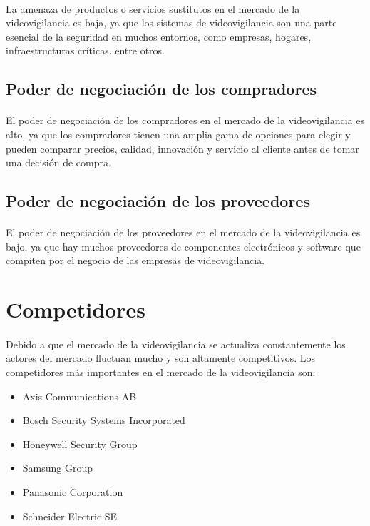 \documentclass{report}
\begin{document}
          \paragraph*{}{La amenaza de productos o servicios sustitutos en el mercado de la videovigilancia es baja, ya que los sistemas de videovigilancia son una parte esencial de la seguridad en muchos entornos, como empresas, hogares, infraestructuras críticas, entre otros.}
        \subsection*{Poder de negociación de los compradores}
          \paragraph*{}{El poder de negociación de los compradores en el mercado de la videovigilancia es alto, ya que los compradores tienen una amplia gama de opciones para elegir y pueden comparar precios, calidad, innovación y servicio al cliente antes de tomar una decisión de compra.}
        \subsection*{Poder de negociación de los proveedores}
          \paragraph*{}{El poder de negociación de los proveedores en el mercado de la videovigilancia es bajo, ya que hay muchos proveedores de componentes electrónicos y software que compiten por el negocio de las empresas de videovigilancia.}
      \section{Competidores}
        \paragraph*{}{Debido a que el mercado de la videovigilancia se actualiza constantemente los actores del mercado fluctuan mucho y son altamente competitivos. Los competidores más importantes en el mercado de la videovigilancia son:}
        \begin{multicols}{3}
          \begin{itemize}
            \item Axis Communications AB
            \item Bosch Security Systems Incorporated
            \item Honeywell Security Group
            \item Samsung Group
            \item Panasonic Corporation
            \item Schneider Electric SE
          \end{itemize}
        \end{multicols}
\end{document}

